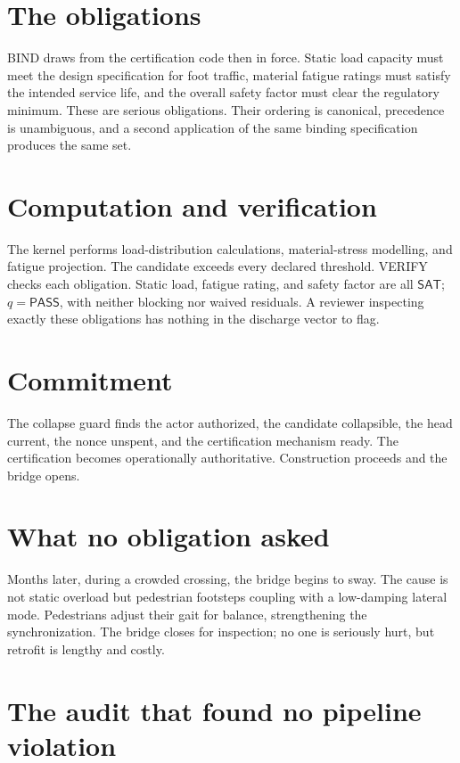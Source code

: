 \documentclass[11pt,openany]{book}
\newcommand{\Pass}{\mathsf{PASS}}
\begin{document}
\section*{The obligations}

BIND draws from the certification code then in force. Static load capacity must
meet the design specification for foot traffic, material fatigue ratings must
satisfy the intended service life, and the overall safety factor must clear the
regulatory minimum. These are serious obligations. Their ordering is canonical,
precedence is unambiguous, and a second application of the same binding
specification produces the same set.

\section*{Computation and verification}

The kernel performs load-distribution calculations, material-stress modelling,
and fatigue projection. The candidate exceeds every declared threshold.
VERIFY checks each obligation. Static load, fatigue rating, and safety factor
are all \(\mathsf{SAT}\); \(q=\Pass\), with neither blocking nor waived
residuals. A reviewer inspecting exactly these obligations has nothing in the
discharge vector to flag.

\section*{Commitment}

The collapse guard finds the actor authorized, the candidate collapsible, the
head current, the nonce unspent, and the certification mechanism ready. The
certification becomes operationally authoritative. Construction proceeds and
the bridge opens.

\section*{What no obligation asked}

Months later, during a crowded crossing, the bridge begins to sway. The cause
is not static overload but pedestrian footsteps coupling with a low-damping
lateral mode. Pedestrians adjust their gait for balance, strengthening the
synchronization. The bridge closes for inspection; no one is seriously hurt,
but retrofit is lengthy and costly.

\section*{The audit that found no pipeline violation}
\end{document}
